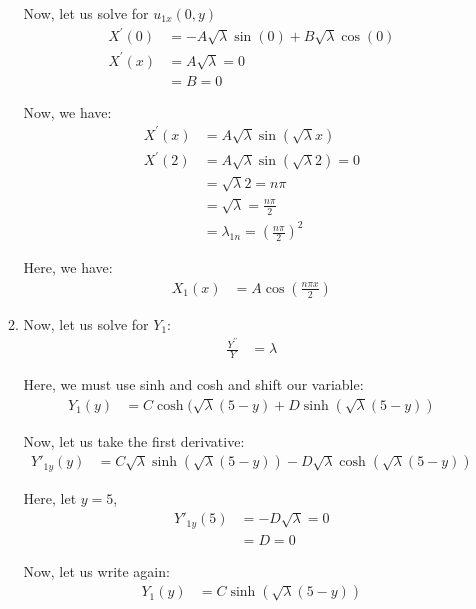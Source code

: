 \documentclass{article}
\begin{document}
\begin{enumerate}
\begin{enumerate}
    Now, let us solve for $u_{1x}(0, y)$
    \begin{align}
      X^\prime(0) & = -A \sqrt \lambda \sin(0) + B \sqrt \lambda \cos(0)\\
      X^\prime(x) & = A \sqrt \lambda = 0\\
      & = B = 0
    \end{align}

    Now, we have:
    \begin{align}
      X^\prime(x) & = A \sqrt \lambda \sin(\sqrt \lambda x)\\
      X^\prime(2) & = A \sqrt \lambda \sin(\sqrt \lambda 2) = 0\\
      & = \sqrt \lambda 2 = n \pi\\
      & = \sqrt \lambda = \frac{n \pi}{2}\\
      & = \lambda_{1n} = \left(\frac{n \pi}{2}\right)^2
    \end{align}

    Here, we have:
    \begin{align}
      X_1(x) & = A \cos\left(\frac{n \pi x}{2}\right)
    \end{align}

  \item Now, let us solve for $Y_1$:
  \begin{align}
    \frac{Y^{\prime\prime}}{Y} & = \lambda
  \end{align}

  Here, we must use sinh and cosh and shift our variable:
  \begin{align}
    Y_1(y) & = C \cosh(\sqrt \lambda (5 - y) + D \sinh(\sqrt \lambda (5 - y))
  \end{align}

  Now, let us take the first derivative:
  \begin{align}
    Y\prime_{1y}(y) & = C \sqrt \lambda \sinh (\sqrt \lambda (5 - y)) - D \sqrt \lambda \cosh(\sqrt \lambda (5 - y))
  \end{align}

  Here, let $y = 5$,
  \begin{align}
    Y\prime_{1y}(5) & = -D \sqrt \lambda = 0\\
    & = D = 0
  \end{align}

  Now, let us write again:
  \begin{align}
    Y_{1}(y) & = C \sinh(\sqrt \lambda (5 - y))
  \end{align}


\end{enumerate}
\end{enumerate}
\end{document}
